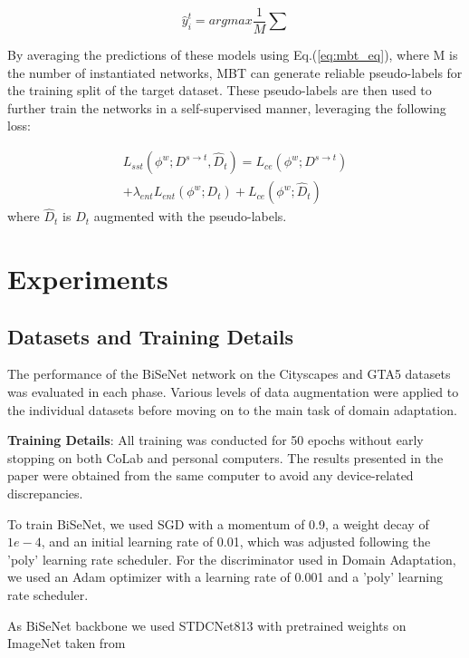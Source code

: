 \documentclass[10pt,twocolumn,letterpaper]{article}
\begin{document}
\begin{equation}
    \hat{y}^t_i = arg max \frac{1}{M} \sum
\label{eq:mbt_eq}
\end{equation}

By averaging the predictions of these models using Eq.(\ref{eq:mbt_eq}), where M is the number of instantiated networks, MBT can generate reliable pseudo-labels for the training split of the target dataset. These pseudo-labels are then used to further train the networks in a self-supervised manner, leveraging the following loss:

\begin{equation}
\begin{split}
    L_{sst}(\phi^w; D^{s \rightarrow t}, \hat{D}_t) = L_{ce}(\phi^w; D^{s \rightarrow t})\\
    + \lambda_{ent} L_{ent}(\phi^w; D_t)+ L_{ce}(\phi^w; \hat{D}_t)
\end{split}
\label{eq:SS_training_loss}
\end{equation}
where $\hat{D}_t$ is ${D}_t$ augmented with the pseudo-labels.


\section{Experiments}
\subsection{Datasets and Training Details}
The performance of the BiSeNet network on the Cityscapes and GTA5 datasets was evaluated in each phase. Various levels of data augmentation were applied to the individual datasets before moving on to the main task of domain adaptation.

\textbf{Training Details}: All training was conducted for 50 epochs without early stopping on both CoLab and personal computers. The results presented in the paper were obtained from the same computer to avoid any device-related discrepancies.

To train BiSeNet, we used SGD with a momentum of 0.9, a weight decay of $1e-4$, and an initial learning rate of 0.01, which was adjusted following the 'poly' learning rate scheduler. For the discriminator used in Domain Adaptation, we used an Adam optimizer with a learning rate of 0.001 and a 'poly' learning rate scheduler.

As BiSeNet backbone we used STDCNet813 with pretrained weights on ImageNet taken from \cite{RealTimeBiSeNet}
\end{document}
